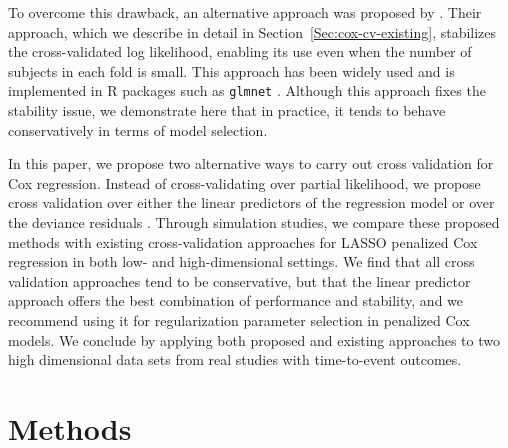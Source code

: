 

To overcome this drawback, an alternative approach was proposed by \citet{Verweij1993}.  Their approach, which we describe in detail in Section~\ref{Sec:cox-cv-existing}, stabilizes the cross-validated log likelihood, enabling its use even when the number of subjects in each fold is small.  This approach has been widely used and is implemented in R packages such as {\tt glmnet} \citep{glmnet}.  Although this approach fixes the stability issue, we demonstrate here that in practice, it tends to behave conservatively in terms of model selection.

In this paper, we propose two alternative ways to carry out cross validation for Cox regression. Instead of cross-validating over partial likelihood, we propose cross validation over either the linear predictors of the regression model or over the deviance residuals \citep{Therneau1990}. Through simulation studies, we compare these proposed methods with existing cross-validation approaches for LASSO penalized Cox regression in both low- and high-dimensional settings.  We find that all cross validation approaches tend to be conservative, but that the linear predictor approach offers the best combination of performance and stability, and we recommend using it for regularization parameter selection in penalized Cox models.  We conclude by applying both proposed and existing approaches to two high dimensional data sets from real studies with time-to-event outcomes.

\section{Methods}

